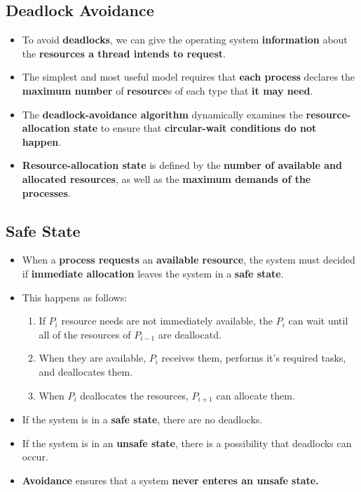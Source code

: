 \documentclass{article}
\begin{document}
    \subsection*{Deadlock Avoidance}
    \begin{itemize}
        \item To avoid \textbf{deadlocks}, we can give the operating system \textbf{information} about the \textbf{resources a thread intends to request}.
        \item The simplest and most useful model requires that \textbf{each process} declares the \textbf{maximum number} of \textbf{resource}s of each type that \textbf{it may need}.
        \item The \textbf{deadlock-avoidance algorithm} dynamically examines the \textbf{resource-allocation state} to ensure that \textbf{circular-wait conditions do not happen}.
        \item \textbf{Resource-allocation state} is defined by the \textbf{number of available and allocated resources}, as well as the \textbf{maximum demands of the processes}.
    \end{itemize}

    \subsection*{Safe State}
    \begin{itemize}
        \item When a \textbf{process requests} an \textbf{available resource}, the system must decided if \textbf{immediate allocation} leaves the system in a \textbf{safe state}.
        \item This happens as follows:
        \begin{enumerate}
            \item If $P_i$ resource needs are not immediately available, the $P_i$ can wait until all of the resources of $P_{i-1}$ are deallocatd.
            \item When they are available, $P_i$ receives them, performs it's required tasks, and deallocates them.
            \item When $P_i$ deallocates the resources, $P_{i+1}$ can allocate them.
        \end{enumerate}
        \item If the system is in a \textbf{safe state}, there are no deadlocks.
        \item If the system is in an \textbf{unsafe state}, there is a possibility that deadlocks can occur.
        \item \textbf{Avoidance} ensures that a system \textbf{never enteres an unsafe state.}
    \end{itemize}
\end{document}
